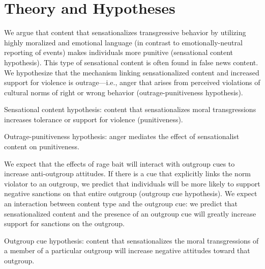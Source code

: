 \documentclass[12pt, letterpaper]{article}
\begin{document}
\section{Theory and Hypotheses}

We argue that content that sensationalizes transgressive behavior by utilizing highly moralized and emotional language (in contrast to emotionally-neutral reporting of events) makes individuals more punitive (sensational content hypothesis). This type of sensational content is often found in false news content. We hypothesize that the mechanism linking sensationalized content and increased support for violence is outrage---i.e., anger that arises from perceived violations of cultural norms of right or wrong behavior \citep{crockett2017moral, stets2012current, turner2006sociological} (outrage-punitiveness hypothesis). 

Sensational content hypothesis: content that sensationalizes moral transgressions increases tolerance or support for violence (punitiveness).

Outrage-punitiveness hypothesis: anger mediates the effect of sensationalist content on punitiveness.

We expect that the effects of rage bait will interact with outgroup cues to increase anti-outgroup attitudes. If there is a cue that explicitly links the norm violator to an outgroup, we predict that individuals will be more likely to support negative sanctions on that entire outgroup (outgroup cue hypothesis). We expect an interaction between content type and the outgroup cue: we predict that sensationalized content and the presence of an outgroup cue will greatly increase support for sanctions on the outgroup.

Outgroup cue hypothesis:  content that sensationalizes the moral transgressions of a member of a particular outgroup will increase negative attitudes toward that outgroup.
\end{document}
